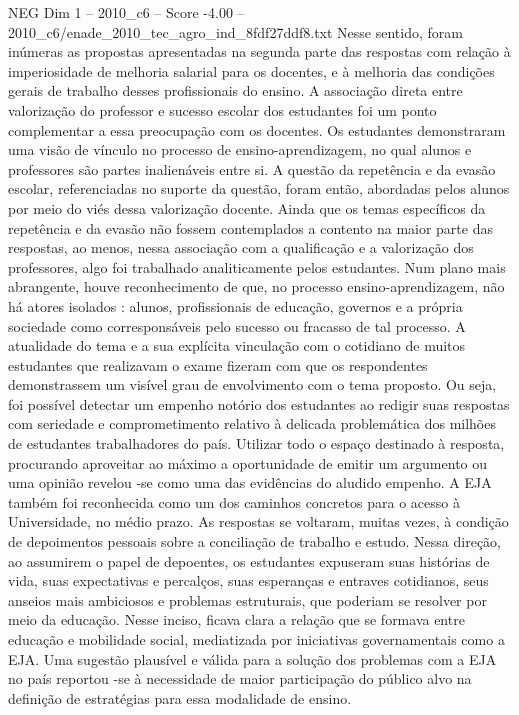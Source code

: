 \begin{textsample}{NEG Dim 1 – 2010\_c6 – Score -4.00 – 2010\_c6/enade\_2010\_tec\_agro\_ind\_8fdf27ddf8.txt}
Nesse sentido, foram inúmeras as propostas apresentadas na segunda parte das respostas com relação à imperiosidade de melhoria salarial para os docentes, e à melhoria das condições gerais de trabalho desses profissionais do ensino.
A associação direta entre valorização do professor e sucesso escolar dos estudantes foi um ponto complementar a essa preocupação com os docentes.
Os estudantes demonstraram uma visão de vínculo no processo de ensino-aprendizagem, no qual alunos e professores são partes inalienáveis entre si.
A questão da repetência e da evasão escolar, referenciadas no suporte da questão, foram então, abordadas pelos alunos por meio do viés dessa valorização docente.
Ainda que os temas específicos da repetência e da evasão não fossem contemplados a contento na maior parte das respostas, ao menos, nessa associação com a qualificação e a valorização dos professores, algo foi trabalhado analiticamente pelos estudantes.
Num plano mais abrangente, houve reconhecimento de que, no processo ensino-aprendizagem, não há atores isolados : alunos, profissionais de educação, governos e a própria sociedade como corresponsáveis pelo sucesso ou fracasso de tal processo.
A atualidade do tema e a sua explícita vinculação com o cotidiano de muitos estudantes que realizavam o exame fizeram com que os respondentes demonstrassem um visível grau de envolvimento com o tema proposto.
Ou seja, foi possível detectar um empenho notório dos estudantes ao redigir suas respostas com seriedade e comprometimento relativo à delicada problemática dos milhões de estudantes trabalhadores do país.
Utilizar todo o espaço destinado à resposta, procurando aproveitar ao máximo a oportunidade de emitir um argumento ou uma opinião revelou -se como uma das evidências do aludido empenho.
A EJA também foi reconhecida como um dos caminhos concretos para o acesso à Universidade, no médio prazo.
As respostas se voltaram, muitas vezes, à condição de depoimentos pessoais sobre a conciliação de trabalho e estudo.
Nessa direção, ao assumirem o papel de depoentes, os estudantes expuseram suas histórias de vida, suas expectativas e percalços, suas esperanças e entraves cotidianos, seus anseios mais ambiciosos e problemas estruturais, que poderiam se resolver por meio da educação.
Nesse inciso, ficava clara a relação que se formava entre educação e mobilidade social, mediatizada por iniciativas governamentais como a EJA.
Uma sugestão plausível e válida para a solução dos problemas com a EJA no país reportou -se à necessidade de maior participação do público alvo na definição de estratégias para essa modalidade de ensino.

\end{textsample}
